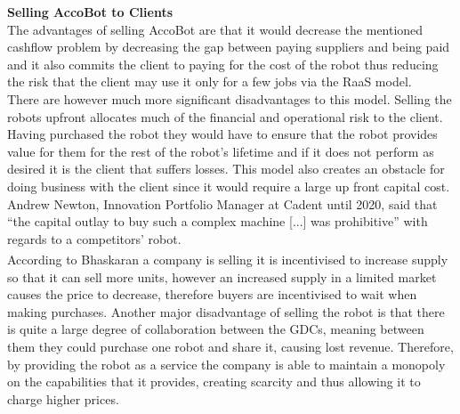 \documentclass[11pt]{article}		%
\newcommand{\supercite}[1]{\textsuperscript{\cite{#1}}}		%
\begin{document}
            \textbf{Selling AccoBot to Clients}
            \\
            The advantages of selling AccoBot are that it would decrease the mentioned cashflow problem by decreasing the gap between paying suppliers and being paid and it also commits the client to paying for the cost of the robot thus reducing the risk that the client may use it only for a few jobs via the RaaS model. 
            \\ \hspace*{3ex}
            There are however much more significant disadvantages to this model. Selling the robots upfront allocates much of the financial and operational risk to the client. Having purchased the robot they would have to ensure that the robot provides value for them for the rest of the robot’s lifetime and if it does not perform as desired it is the client that suffers losses. This model also creates an obstacle for doing business with the client since it would require a large up front capital cost. Andrew Newton, Innovation Portfolio Manager at Cadent until 2020, said that “the capital outlay to buy such a complex machine [...] was prohibitive” with regards to a competitors’ robot. 
\\ \hspace*{3ex}
According to Bhaskaran\supercite{leasing_strategy} a company is selling it is incentivised to increase supply so that it can sell more units, however an increased supply in a limited market causes the price to decrease, therefore buyers are incentivised to wait when making purchases. Another major disadvantage of selling the robot is that there is quite a large degree of collaboration between the GDCs, meaning between them they could purchase one robot and share it, causing lost revenue. Therefore, by providing the robot as a service the company is able to maintain a monopoly on the capabilities that it provides, creating scarcity and thus allowing it to charge higher prices.  
\\
            
\end{document}
